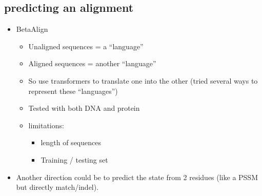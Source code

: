 \documentclass[
  11pt,
  twoside,
  BCOR=10mm,
  listof=totoc]{scrbook}
\begin{document}
\hypertarget{predicting-an-alignment}{%
\subsection{predicting an alignment}\label{predicting-an-alignment}}

\begin{itemize}
\item
  BetaAlign \autocite{dotanHarnessingMachineTranslation2022}

  \begin{itemize}
  \item
    Unaligned sequences = a ``language''
  \item
    Aligned sequences = another ``language''
  \item
    So use transformers to translate one into the other (tried several ways to represent these ``languages'')
  \item
    Tested with both DNA and protein
  \item
    limitations:

    \begin{itemize}
    \item
      length of sequences
    \item
      Training / testing set
    \end{itemize}
  \end{itemize}
\item
  Another direction could be to predict the state from 2 residues (like a PSSM but directly match/indel).
\end{itemize}
\end{document}
